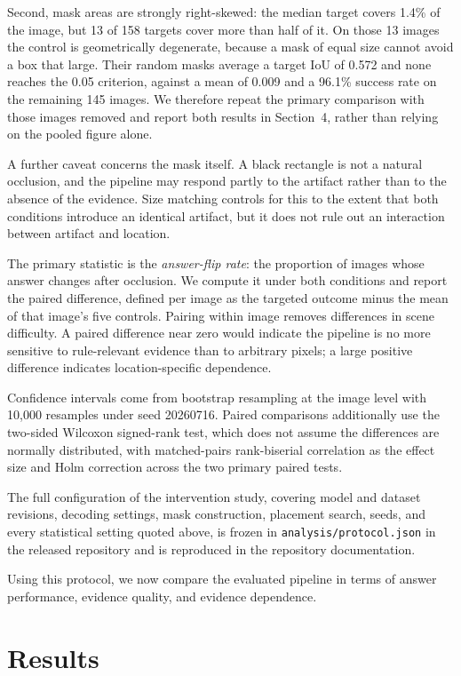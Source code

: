 \documentclass[conference]{IEEEtran}
\begin{document}
Second, mask areas are strongly right-skewed: the median target covers 1.4\% of the image, but 13 of 158 targets cover more than half of it. On those 13 images the control is geometrically degenerate, because a mask of equal size cannot avoid a box that large. Their random masks average a target IoU of 0.572 and none reaches the 0.05 criterion, against a mean of 0.009 and a 96.1\% success rate on the remaining 145 images. We therefore repeat the primary comparison with those images removed and report both results in Section~4, rather than relying on the pooled figure alone.

A further caveat concerns the mask itself. A black rectangle is not a natural occlusion, and the pipeline may respond partly to the artifact rather than to the absence of the evidence. Size matching controls for this to the extent that both conditions introduce an identical artifact, but it does not rule out an interaction between artifact and location.

The primary statistic is the \textit{answer-flip rate}: the proportion of images whose answer changes after occlusion. We compute it under both conditions and report the paired difference, defined per image as the targeted outcome minus the mean of that image's five controls. Pairing within image removes differences in scene difficulty. A paired difference near zero would indicate the pipeline is no more sensitive to rule-relevant evidence than to arbitrary pixels; a large positive difference indicates location-specific dependence.

Confidence intervals come from bootstrap resampling at the image level with 10{,}000 resamples under seed 20260716. Paired comparisons additionally use the two-sided Wilcoxon signed-rank test, which does not assume the differences are normally distributed, with matched-pairs rank-biserial correlation as the effect size and Holm correction across the two primary paired tests.

The full configuration of the intervention study, covering model and dataset revisions, decoding settings, mask construction, placement search, seeds, and every statistical setting quoted above, is frozen in \texttt{analysis/protocol.json} in the released repository and is reproduced in the repository documentation.

Using this protocol, we now compare the evaluated pipeline in terms of answer performance, evidence quality, and evidence dependence.

\section{Results}
\end{document}
